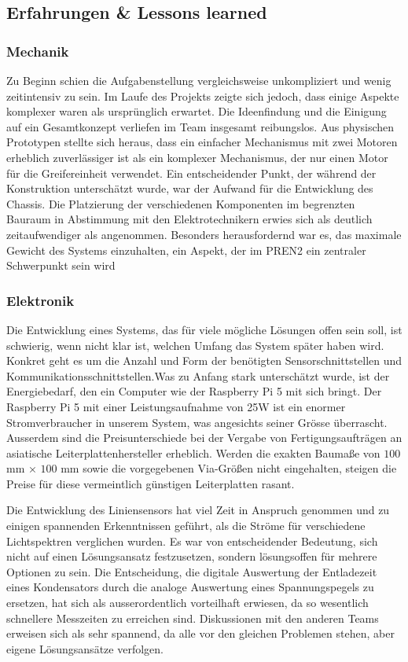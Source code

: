 \documentclass[main.tex]{subfiles} %
\begin{document}
\subsection{Erfahrungen \& Lessons learned}

\subsubsection{Mechanik}

Zu Beginn schien die Aufgabenstellung vergleichsweise unkompliziert und wenig zeitintensiv zu sein.
Im Laufe des Projekts zeigte sich jedoch, dass einige Aspekte komplexer waren als ursprünglich erwartet.
Die Ideenfindung und die Einigung auf ein Gesamtkonzept verliefen im Team insgesamt reibungslos.
Aus physischen Prototypen stellte sich heraus, dass ein einfacher Mechanismus mit zwei Motoren erheblich zuverlässiger
ist als ein komplexer Mechanismus, der nur einen Motor für die Greifereinheit verwendet.
Ein entscheidender Punkt, der während der Konstruktion unterschätzt wurde, war der Aufwand für die Entwicklung
des Chassis. Die Platzierung der verschiedenen Komponenten im begrenzten Bauraum in Abstimmung mit den 
Elektrotechnikern erwies sich als deutlich zeitaufwendiger als angenommen.
Besonders herausfordernd war es, das maximale Gewicht des Systems einzuhalten, ein Aspekt,
der im PREN2 ein zentraler Schwerpunkt sein wird


\subsubsection{Elektronik}
Die Entwicklung eines Systems, das für viele mögliche Lösungen offen sein soll,
ist schwierig, wenn nicht klar ist, welchen Umfang das System später haben
wird. Konkret geht es um die Anzahl und Form der benötigten
Sensorschnittstellen und Kommunikationsschnittstellen.Was zu Anfang stark
unterschätzt wurde, ist der Energiebedarf, den ein Computer wie der Raspberry
Pi 5 mit sich bringt. Der Raspberry Pi 5 mit einer Leistungsaufnahme von 25W
ist ein enormer Stromverbraucher in unserem System, was angesichts seiner
Grösse überrascht. Ausserdem sind die Preisunterschiede bei der Vergabe von
Fertigungsaufträgen an asiatische Leiterplattenhersteller erheblich. Werden die
exakten Baumaße von $100$ mm × $100$ mm sowie die vorgegebenen Via-Größen nicht
eingehalten, steigen die Preise für diese vermeintlich günstigen Leiterplatten rasant.

Die Entwicklung des Liniensensors hat viel Zeit in Anspruch genommen und zu
einigen spannenden Erkenntnissen geführt, als die Ströme für verschiedene
Lichtspektren verglichen wurden. Es war von entscheidender Bedeutung, sich
nicht auf einen Lösungsansatz festzusetzen, sondern lösungsoffen für mehrere
Optionen zu sein. Die Entscheidung, die digitale Auswertung der Entladezeit
eines Kondensators durch die analoge Auswertung eines Spannungspegels zu
ersetzen, hat sich als ausserordentlich vorteilhaft erwiesen, da so wesentlich
schnellere Messzeiten zu erreichen sind. Diskussionen mit den anderen Teams
erweisen sich als sehr spannend, da alle vor den gleichen Problemen stehen,
aber eigene Lösungsansätze verfolgen.
\end{document}
